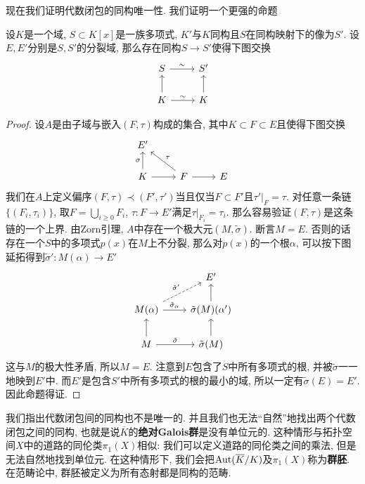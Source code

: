 现在我们证明代数闭包的同构唯一性.
我们证明一个更强的命题
\begin{thm}[同构延拓定理]\label{iso ext thm}
    设$K$是一个域, $S\subset K[x]$是一族多项式, $K'$与$K$同构且$S$在同构映射下的像为$S'$.
    设$E,E'$分别是$S,S'$的分裂域, 那么存在同构$S\to S'$使得下图交换
    \[\begin{tikzcd}
        S\ar[r, "\sim"] & S'\\
        K\ar[u] \ar[r, "\sim"] & K\ar[u]
    \end{tikzcd}\]
\end{thm}
\begin{proof}
    设$A$是由子域与嵌入$(F,\tau)$构成的集合, 其中$K\subset F\subset E$且使得下图交换
    \[\begin{tikzcd}
        E' & & \\
        K\ar[u, "\sigma"] \ar[r] & F \ar[ul, "\tau"'] \ar[r] & E
    \end{tikzcd}\]
    我们在$A$上定义偏序$(F,\tau)\prec(F',\tau')$当且仅当$F\subset F'$且$\tau'|_F=\tau$.
    对任意一条链$\{(F_i,\tau_i)\}$, 取$F=\bigcup_{i\geq 0}F_i$, $\tau:F\to E'$满足$\tau|_{F_i}=\tau_i$.
    那么容易验证$(F,\tau)$是这条链的一个上界.
    由Zorn引理, $A$中存在一个极大元$(M,\tilde{\sigma})$.
    断言$M=E$. 否则的话存在一个$S$中的多项式$p(x)$在$M$上不分裂, 那么对$p(x)$的一个根$\alpha$, 可以按下图延拓得到$\tilde{\sigma}':M(\alpha)\to E'$
    \[\begin{tikzcd}
         & E'\\
        M(\alpha)\ar[r, "\tilde{\sigma}_\alpha"] \ar[ur, dashed, "\tilde{\sigma}'"] & \tilde{\sigma}(M)(\alpha') \ar[u]\\
        M \ar[r, "\tilde{\sigma}"] \ar[u] & \tilde{\sigma}(M) \ar[u]
    \end{tikzcd}\]
    这与$M$的极大性矛盾, 所以$M=E$.
    注意到$E$包含了$S$中所有多项式的根, 并被$\tilde{\sigma}$一一地映到$E'$中.
    而$E'$是包含$S'$中所有多项式的根的最小的域, 所以一定有$\tilde{\sigma}(E)=E'$.
    因此命题得证.
\end{proof}

\begin{rem}
    我们指出代数闭包间的同构也不是唯一的.
    并且我们也无法``自然''地找出两个代数闭包之间的同构, 也就是说$\overline{K}$的\textbf{绝对Galois群}是没有单位元的.
    这种情形与拓扑空间$X$中的道路的同伦类$\pi_1(X)$相似: 我们可以定义道路的同伦类之间的乘法, 但是无法自然地找到单位元.
    在这种情形下, 我们会把$\operatorname{Aut}(\overline{K}/K)$及$\pi_1(X)$称为\textbf{群胚}.
    在范畴论中, 群胚被定义为所有态射都是同构的范畴.
\end{rem}
